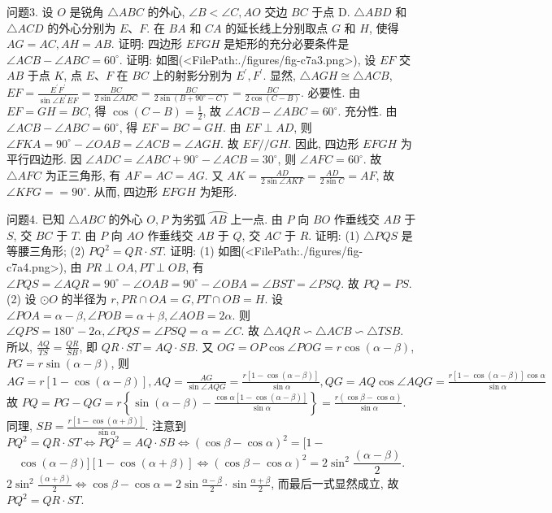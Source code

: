 问题3. 设 $O$ 是锐角 $\triangle A B C$ 的外心, $\angle B<\angle C, A O$ 交边 $B C$ 于点 D. $\triangle A B D$ 和 $\triangle A C D$ 的外心分别为 $E 、 F$. 在 $B A$ 和 $C A$ 的延长线上分别取点 $G$ 和 $H$, 使得 $A G=A C, A H=A B$. 证明: 四边形 $E F G H$ 是矩形的充分必要条件是 $\angle A C B-\angle A B C=60^{\circ}$.
证明: 如图(<FilePath:./figures/fig-c7a3.png>), 设 $E F$ 交 $A B$ 于点 $K$, 点 $E 、 F$ 在 $B C$ 上的射影分别为 $E^{\prime}, F^{\prime}$. 显然, $\triangle A G H \cong \triangle A C B$, $E F=\frac{E^{\prime} F^{\prime}}{\sin \angle E^{\prime} E F}=\frac{B C}{2 \sin \angle A D C}=\frac{B C}{2 \sin \left(B+90^{\circ}-C\right)}= \frac{B C}{2 \cos (C-B)}$.
必要性.
由 $E F=G H=B C$, 得 $\cos (C-B)=\frac{1}{2}$, 故 $\angle A C B-\angle A B C=60^{\circ}$.
充分性.
由 $\angle A C B-\angle A B C=60^{\circ}$, 得 $E F=B C=G H$. 由 $E F \perp A D$, 则 $\angle F K A=90^{\circ}-\angle O A B=\angle A C B=\angle A G H$. 故 $E F / / G H$. 因此, 四边形 $E F G H$ 为平行四边形.
因 $\angle A D C=\angle A B C+90^{\circ}- \angle A C B=30^{\circ}$, 则 $\angle A F C=60^{\circ}$. 故 $\triangle A F C$ 为正三角形, 有 $A F=A C=A G$. 又 $A K=\frac{A D}{2 \sin \angle A K F}=\frac{A D}{2 \sin C}=A F$, 故 $\angle K F G==90^{\circ}$. 从而, 四边形 $E F G H$ 为矩形.



问题4. 已知 $\triangle A B C$ 的外心 $O, P$ 为劣弧 $\overparen{A B}$ 上一点.
由 $P$ 向 $B O$ 作垂线交 $A B$ 于 $S$, 交 $B C$ 于 $T$. 由 $P$ 向 $A O$ 作垂线交 $A B$ 于 $Q$, 交 $A C$ 于 $R$. 证明: (1) $\triangle P Q S$ 是等腰三角形; (2) $P Q^2=Q R \cdot S T$.
证明: (1) 如图(<FilePath:./figures/fig-c7a4.png>), 由 $P R \perp O A, P T \perp O B$, 有
$\angle P Q S=\angle A Q R=90^{\circ}-\angle O A B=90^{\circ}-\angle O B A= \angle B S T=\angle P S Q$. 故 $P Q=P S$.
(2) 设 $\odot O$ 的半径为 $r, P R \cap O A=G, P T \cap O B=H$. 设 $\angle P O A=\alpha-\beta, \angle P O B=\alpha+\beta, \angle A O B= 2 \alpha$. 则 $\angle Q P S=180^{\circ}-2 \alpha, \angle P Q S=\angle P S Q=\alpha= \angle C$. 故 $\triangle A Q R \backsim \triangle A C B \backsim \triangle T S B$. 所以, $\frac{A Q}{T S}=\frac{Q R}{S B}$, 即 $Q R \cdot S T=A Q \cdot S B$. 又 $O G=O P \cos \angle P O G=r \cos (\alpha-\beta)$,
$P G=r \sin (\alpha-\beta)$, 则 $A G=r[1-\cos (\alpha-\beta)], A Q=\frac{A G}{\sin \angle A Q G}= \frac{r[1-\cos (\alpha-\beta)]}{\sin \alpha}, Q G=A Q \cos \angle A Q G=\frac{r[1-\cos (\alpha-\beta)] \cos \alpha}{\sin \alpha}$ 故 $P Q=P G-Q G=r\left\{\sin (\alpha-\beta)-\frac{\cos \alpha[1-\cos (\alpha-\beta)]}{\sin \alpha}\right\}=\frac{r(\cos \beta-\cos \alpha)}{\sin \alpha}$. 同理, $S B=\frac{r[1-\cos (\alpha+\beta)]}{\sin \alpha}$.
注意到 $P Q^2=Q R \cdot S T \Leftrightarrow P Q^2=A Q \cdot S B \Leftrightarrow(\cos \beta-\cos \alpha)^2=[1-$
$$
\cos (\alpha-\beta)][1-\cos (\alpha+\beta)] \Leftrightarrow(\cos \beta-\cos \alpha)^2=2 \sin ^2 \frac{(\alpha-\beta)}{2} .
$$
$2 \sin ^2 \frac{(\alpha+\beta)}{2} \Leftrightarrow \cos \beta-\cos \alpha=2 \sin \frac{\alpha-\beta}{2} \cdot \sin \frac{\alpha+\beta}{2}$, 而最后一式显然成立, 故 $P Q^2=Q R \cdot S T$.



